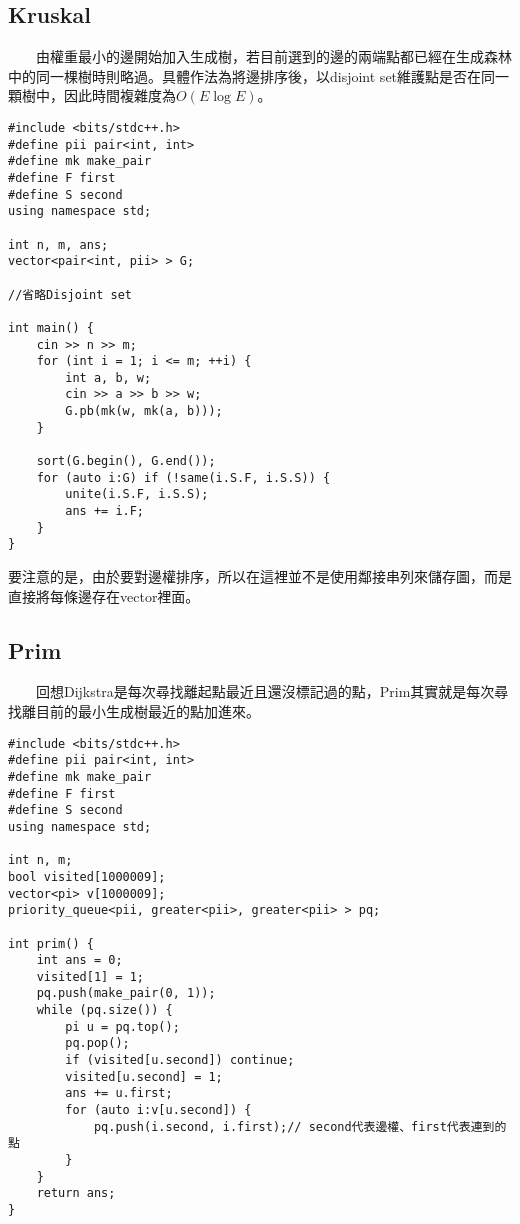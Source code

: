 \subsection{Kruskal}

　　由權重最小的邊開始加入生成樹，若目前選到的邊的兩端點都已經在生成森林中的同一棵樹時則略過。具體作法為將邊排序後，以disjoint set維護點是否在同一顆樹中，因此時間複雜度為$O(E\log E)$。

\clearpage

\begin{lstlisting}[caption=kruskal]
#include <bits/stdc++.h>
#define pii pair<int, int>
#define mk make_pair
#define F first
#define S second
using namespace std;

int n, m, ans;
vector<pair<int, pii> > G;

//省略Disjoint set

int main() { 
	cin >> n >> m;
	for (int i = 1; i <= m; ++i) {
		int a, b, w;
		cin >> a >> b >> w;
		G.pb(mk(w, mk(a, b)));
	}
	
	sort(G.begin(), G.end());
	for (auto i:G) if (!same(i.S.F, i.S.S)) {
		unite(i.S.F, i.S.S);
		ans += i.F;
	}
}
\end{lstlisting}

要注意的是，由於要對邊權排序，所以在這裡並不是使用鄰接串列來儲存圖，而是直接將每條邊存在vector裡面。

\subsection{Prim}

　　回想Dijkstra是每次尋找離起點最近且還沒標記過的點，Prim其實就是每次尋找離目前的最小生成樹最近的點加進來。
　　
\clearpage

\begin{lstlisting}[caption=prim]
#include <bits/stdc++.h>
#define pii pair<int, int>
#define mk make_pair
#define F first
#define S second
using namespace std;

int n, m;
bool visited[1000009];
vector<pi> v[1000009];
priority_queue<pii, greater<pii>, greater<pii> > pq;

int prim() {
	int ans = 0;
	visited[1] = 1;
	pq.push(make_pair(0, 1));
	while (pq.size()) {
		pi u = pq.top();
		pq.pop();
		if (visited[u.second]) continue;
		visited[u.second] = 1;
		ans += u.first;
		for (auto i:v[u.second]) {
			pq.push(i.second, i.first);// second代表邊權、first代表連到的點
		}
	}
	return ans;
}
\end{lstlisting}

